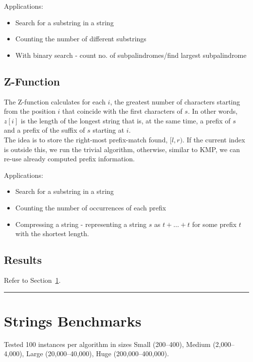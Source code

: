 \documentclass[12pt]{article}
\begin{document}
Applications:
\begin{itemize}
 \item Search for a substring in a string
 \item Counting the number of different substrings
 \item With binary search - count no. of subpalindromes/find largest subpalindrome
\end{itemize}

\subsection{Z-Function\cite{z_function_cp}}
The Z-function calculates for each $i$, the greatest number of characters starting from the position $i$ that coincide with the first characters of $s$.  
In other words, $z[i]$ is the length of the longest string that is, at the same time, a prefix of $s$ and a prefix of the suffix of $s$ starting at $i$.  \\
The idea is to store the right-most prefix-match found, $[l, r)$. If the current index is outside this, we run the trivial algorithm, otherwise, similar to KMP, we can re-use already computed prefix information.

Applications:
\begin{itemize}
 \item Search for a substring in a string
 \item Counting the number of occurrences of each prefix
 \item Compressing a string - representing a string $s$ as $t+ \dots +t$ for some prefix $t$ with the shortest length.
\end{itemize}

\subsection{Results}
Refer to Section~\ref{sec:strings-benchmarks}.

\bigskip
\hrule height 1pt
\bigskip

\section{Strings Benchmarks}\label{sec:strings-benchmarks}

Tested 100 instances per algorithm in sizes Small (200–400), Medium (2{,}000–4{,}000), Large (20{,}000–40{,}000), Huge (200{,}000–400{,}000).
\end{document}
